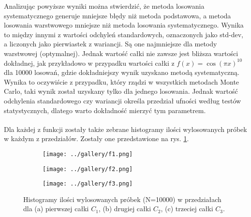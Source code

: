 \documentclass[a4paper, 12pt]{article}
\begin{document}
\noaka Analizując powyższe wyniki można stwierdzić, że metoda losowania systematycznego generuje mniejsze błędy niż metoda podstawowa, a metoda losowania warstwowego mniejsze niż metoda losowania systematycznego.
Wynika to między innymi z wartości odchyleń standardowych, oznaczonych jako std-dev, a liczonych jako pierwiastek z wariancji.
Są one najmniejsze dla metody warstwowej (optymalnej).
Jednak wartość całki nie zawsze jest bliższa wartości dokładnej, jak przykładowo w przypadku wartości całki z $f(x) = \cos(\pi x)^{10}$ dla 10000 losowań, gdzie dokładniejszy wynik uzyskano metodą systematyczną.
Wynika to oczywiście z przypadku, który rządzi w wszystkich metodach Monte Carlo, taki wynik został uzyskany tylko dla jednego losowania.
Jednak wartość odchylenia standardowego czy wariancji określa przedział ufności według testów statystycznych, dlatego warto dokładność mierzyć tym parametrem.
\\
\\
Dla każdej z funkcji zostały także zebrane histogramy ilości wylosowanych próbek w każdym z przedziałów.
Zostały one przedstawione na rys. \ref{fig:histogramy}.
\begin{figure}[H]
    \centering
    \begin{subfigure}{0.49\textwidth}
        \texttt{[image: ../gallery/f1.png]}
        \caption{}
    \end{subfigure}
    \begin{subfigure}{0.49\textwidth}
        \texttt{[image: ../gallery/f2.png]}
        \caption{}
    \end{subfigure}
    \begin{subfigure}{0.49\textwidth}
        \texttt{[image: ../gallery/f3.png]}
        \caption{}
    \end{subfigure}
    \caption{Histogramy ilości wylosowanych próbek (N=10000) w przedziałach dla (a) pierwszej całki $C_1$, (b) drugiej całki $C_2$, (c) trzeciej całki $C_3$.}
    \label{fig:histogramy}
\end{figure}
\end{document}
